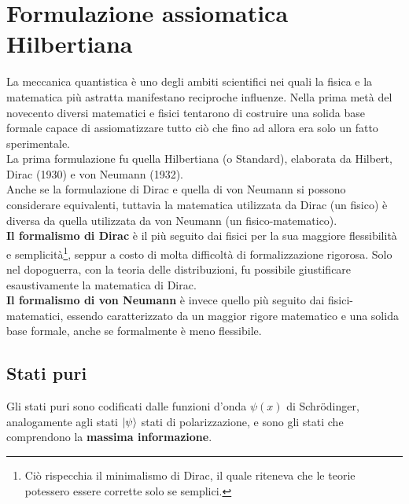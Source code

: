 \documentclass[FisicaTeorica.tex]{subfiles}
\begin{document}
\chapter{Formulazione assiomatica Hilbertiana}

La meccanica quantistica è uno degli ambiti scientifici nei quali la fisica e la matematica più astratta manifestano reciproche influenze. Nella prima metà del novecento diversi matematici e fisici tentarono di costruire una solida base formale capace di assiomatizzare tutto ciò che fino ad allora era solo un fatto sperimentale. \\
La prima formulazione fu quella Hilbertiana (o Standard), elaborata da Hilbert, Dirac (1930) e von Neumann (1932).\\ Anche se la formulazione di Dirac e quella di von Neumann si possono considerare equivalenti, tuttavia la matematica utilizzata da Dirac (un  fisico) è diversa da quella utilizzata da von Neumann (un fisico-matematico).\\
\textbf{Il formalismo di \textbf{Dirac}} è il più seguito dai fisici per la sua maggiore flessibilità e semplicità\footnote{Ciò rispecchia il minimalismo di Dirac, il quale riteneva che le teorie potessero essere corrette solo se semplici.}, seppur a costo di molta difficoltà di formalizzazione rigorosa. Solo nel dopoguerra, con la teoria delle distribuzioni, fu possibile giustificare esaustivamente la matematica di Dirac.\\
\textbf{Il formalismo di von Neumann} è invece quello più seguito dai fisici-matematici, essendo caratterizzato da un maggior rigore matematico e una solida base formale, anche se formalmente è meno flessibile.

\section{Stati puri}\label{sec:stati_puri}
Gli stati puri sono codificati dalle funzioni d'onda $\psi \left(x\right)$ di Schrödinger, analogamente agli stati $\Ket{\psi}$ stati di polarizzazione, e sono gli stati che comprendono la \textbf{massima informazione}.
\end{document}
